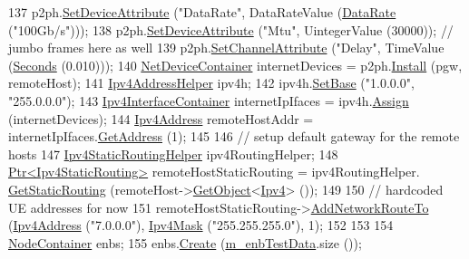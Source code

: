 \begin{DoxyCode}
137   p2ph.\hyperlink{classns3_1_1PointToPointHelper_a4577f5ab8c387e5528af2e0fbab1152e}{SetDeviceAttribute} (\textcolor{stringliteral}{"DataRate"}, DataRateValue (\hyperlink{classns3_1_1DataRate}{DataRate} (\textcolor{stringliteral}{"100Gb/s"})));
138   p2ph.\hyperlink{classns3_1_1PointToPointHelper_a4577f5ab8c387e5528af2e0fbab1152e}{SetDeviceAttribute} (\textcolor{stringliteral}{"Mtu"}, UintegerValue (30000)); \textcolor{comment}{// jumbo frames here as well}
139   p2ph.\hyperlink{classns3_1_1PointToPointHelper_a6b5317fd17fb61e5a53f8d66a90b63b9}{SetChannelAttribute} (\textcolor{stringliteral}{"Delay"}, TimeValue (\hyperlink{group__timecivil_ga33c34b816f8ff6628e33d5c8e9713b9e}{Seconds} (0.010)));  
140   \hyperlink{classns3_1_1NetDeviceContainer}{NetDeviceContainer} internetDevices = p2ph.\hyperlink{classns3_1_1PointToPointHelper_ab9162fea3e88722666fed1106df1f9ec}{Install} (pgw, remoteHost);  
141   \hyperlink{classns3_1_1Ipv4AddressHelper}{Ipv4AddressHelper} ipv4h;
142   ipv4h.\hyperlink{classns3_1_1Ipv4AddressHelper_acf7b16dd25bac67e00f5e25f90a9a035}{SetBase} (\textcolor{stringliteral}{"1.0.0.0"}, \textcolor{stringliteral}{"255.0.0.0"});
143   \hyperlink{classns3_1_1Ipv4InterfaceContainer}{Ipv4InterfaceContainer} internetIpIfaces = ipv4h.\hyperlink{classns3_1_1Ipv4AddressHelper_af8e7f4a1a7e74c00014a1eac445a27af}{Assign} (internetDevices);
144   \hyperlink{classns3_1_1Ipv4Address}{Ipv4Address} remoteHostAddr = internetIpIfaces.\hyperlink{classns3_1_1Ipv4InterfaceContainer_ae63208dcd222be986822937ee4aa828c}{GetAddress} (1);
145   
146   \textcolor{comment}{// setup default gateway for the remote hosts}
147   \hyperlink{classns3_1_1Ipv4StaticRoutingHelper}{Ipv4StaticRoutingHelper} ipv4RoutingHelper;
148   \hyperlink{classns3_1_1Ptr}{Ptr<Ipv4StaticRouting>} remoteHostStaticRouting = ipv4RoutingHelper.
      \hyperlink{classns3_1_1Ipv4StaticRoutingHelper_a731206e50d305695dac7fb2ef963a4bb}{GetStaticRouting} (remoteHost->\hyperlink{classns3_1_1Object_a13e18c00017096c8381eb651d5bd0783}{GetObject}<\hyperlink{classns3_1_1Ipv4}{Ipv4}> ());
149 
150   \textcolor{comment}{// hardcoded UE addresses for now}
151   remoteHostStaticRouting->\hyperlink{classns3_1_1Ipv4StaticRouting_a8bf5eaa7ba49fe33c78c70d5560b6c39}{AddNetworkRouteTo} (\hyperlink{classns3_1_1Ipv4Address}{Ipv4Address} (\textcolor{stringliteral}{"7.0.0.0"}), 
      \hyperlink{classns3_1_1Ipv4Mask}{Ipv4Mask} (\textcolor{stringliteral}{"255.255.255.0"}), 1);
152   
153 
154   \hyperlink{classns3_1_1NodeContainer}{NodeContainer} enbs;
155   enbs.\hyperlink{classns3_1_1NodeContainer_a787f059e2813e8b951cc6914d11dfe69}{Create} (\hyperlink{classLteEpcE2eDataTestCase_aa2d95eb5a8d25e0d6caa7dbdbe77a85e}{m\_enbTestData}.size ());

\end{DoxyCode}
